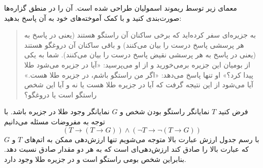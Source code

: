 معمای زیر توسط ریموند اسمولیان طراحی شده است. آن را در منطق گزاره‌ها صورت‌بندی کنید و با کمک آموخته‌های خود به آن پاسخ بدهید:
\begin{quote}
به جزیره‌ای سفر کرده‌اید که برخی ساکنان آن راستگو هستند (یعنی در پاسخ به هر پرسشی پاسخ درست را بیان می‌کنند) و باقی ساکنان آن دروغگو هستند (یعنی در پاسخ به هر پرسشی نقیض پاسخ درست را بیان می‌کنند). شما به یکی از بومیان این جزیره برمی‌خورید و از او می‌پرسید: «آیا در جزیره می‌شود طلا پیدا کرد؟» او تنها پاسخ می‌دهد: «اگر من راستگو باشم، در جزیره طلا هست.» آیا می‌شود از این نتیجه گرفت که آیا در جزیره طلا هست یا نه و آیا این شخص راستگو است یا دروغگو؟
\end{quote}\quad
\begin{ans}
فرض کنید $T$ نمایانگر راستگو بودن شخص و $G$ نمایانگر وجود طلا در جزیره باشد. با توجه به مفروضات مسئله می‌دانیم
$$
(T\to(T\to G))\wedge(\neg T\to\neg(T\to G))
$$
با رسم جدول ارزش عبارت بالا متوجه می‌شویم تنها ارزش‌دهی ممکن به اتم‌های $T$ و $G$ که عبارت بالا را صادق کند ارزش‌دهی‌ای است که به هر دو مقدار صادق نسبت دهد. بنابراین شخص بومی راستگو است و در جزیره طلا وجود دارد.
\end{ans}
